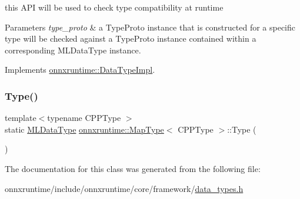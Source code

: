 this A\+PI will be used to check type compatibility at runtime 


\begin{DoxyParams}{Parameters}
{\em type\+\_\+proto} & a Type\+Proto instance that is constructed for a specific type will be checked against a Type\+Proto instance contained within a corresponding M\+L\+Data\+Type instance. \\
\hline
\end{DoxyParams}


Implements \mbox{\hyperlink{classonnxruntime_1_1DataTypeImpl_a94b2c274bd74068291356c81515d69a1}{onnxruntime\+::\+Data\+Type\+Impl}}.

\mbox{\label{classonnxruntime_1_1MapType_a8c91299b175dfdadc41c2d732eecb3a3}} 
\subsubsection{\texorpdfstring{Type()}{Type()}}
{\footnotesize\ttfamily template$<$typename C\+P\+P\+Type $>$ \\
static \mbox{\hyperlink{namespaceonnxruntime_ad77d0a6e838ec7da5dc35fed5ee66b49}{M\+L\+Data\+Type}} \mbox{\hyperlink{classonnxruntime_1_1MapType}{onnxruntime\+::\+Map\+Type}}$<$ C\+P\+P\+Type $>$\+::Type (\begin{DoxyParamCaption}{ }\end{DoxyParamCaption})\hspace{0.3cm}{\ttfamily [static]}}



The documentation for this class was generated from the following file\+:\begin{DoxyCompactItemize}
\item 
onnxruntime/include/onnxruntime/core/framework/\mbox{\hyperlink{data__types_8h}{data\+\_\+types.\+h}}\end{DoxyCompactItemize}
